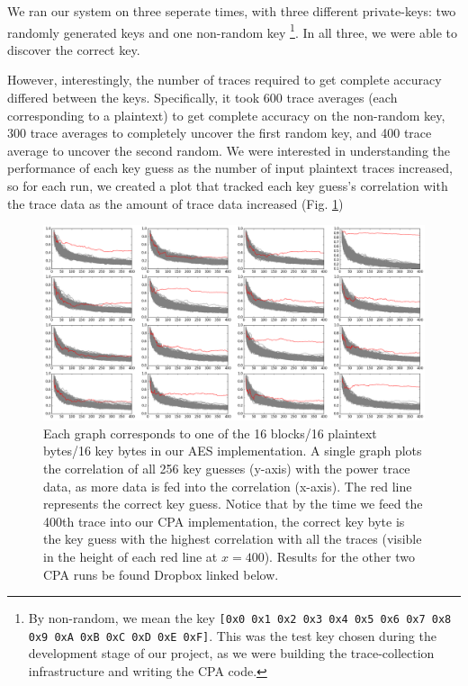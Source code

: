 \documentclass[journal]{ieee_style}
\begin{document}
We ran our system on three seperate times, with three different private-keys: two randomly generated keys and one non-random key \footnote{By non-random, we mean the key \texttt{[0x0 0x1 0x2 0x3 0x4 0x5 0x6 0x7 0x8 0x9 0xA 0xB 0xC 0xD 0xE 0xF]}. This was the test key chosen during the development stage of our project, as we were building the trace-collection infrastructure and writing the CPA code.}. In all three, we were able to discover the correct key.

However, interestingly, the number of traces required to get complete accuracy differed between the keys. Specifically, it took 600 trace averages (each corresponding to a plaintext) to get complete accuracy on the non-random key, 300 trace averages to completely uncover the first random key, and 400 trace average to uncover the second random. We were interested in understanding the performance of each key guess as the number of input plaintext traces increased, so for each run, we created a plot that tracked each key guess's correlation with the trace data as the amount of trace data increased (Fig. \ref{results_random2})

\begin{figure}[!t]
\centering
\includegraphics[width=7in]{12-04-15-19-46-23-newrandomkey2-corr-evolution}
\caption{Each graph corresponds to one of the 16 blocks/16 plaintext bytes/16 key bytes in our AES implementation. A single graph plots the correlation of all 256 key guesses (y-axis) with the power trace data, as more data is fed into the correlation (x-axis). The red line represents the correct key guess. Notice that by the time we feed the 400th trace into our CPA implementation, the correct key byte is the key guess with the highest correlation with all the traces (visible in the height of each red line at $x=400$). Results for the other two CPA runs be found Dropbox linked below.}
\label{results_random2}
\end{figure}
\end{document}
